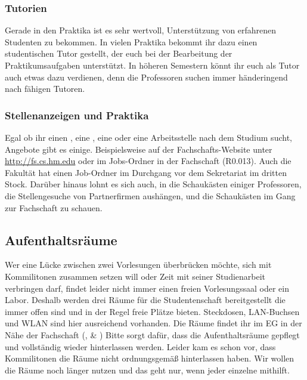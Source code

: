 \subsubsection{Tutorien}
Gerade in den Praktika ist es sehr wertvoll, Unterstützung von 
erfahrenen Studenten zu bekommen. In vielen Praktika bekommt ihr 
dazu einen studentischen Tutor gestellt, der euch bei der Bearbeitung 
der Praktikumsaufgaben unterstützt. \doublebreak
In höheren Semestern könnt ihr euch als Tutor auch etwas dazu 
verdienen, denn die Professoren suchen immer händeringend nach 
fähigen Tutoren. 

\subsubsection{Stellenanzeigen und Praktika}
Egal ob ihr einen , eine , 
eine  oder eine Arbeitsstelle nach dem 
Studium sucht, Angebote gibt es einige. Beispielsweise auf der 
Fachschafts-Website unter \url{http://fs.cs.hm.edu} \arrow {} \arrow {} oder im
Jobs-Ordner in der Fachschaft (R0.013). Auch die Fakultät hat einen Job-Ordner im Durchgang vor dem Sekretariat im dritten Stock. Darüber 
hinaus lohnt es sich auch, in die Schaukästen einiger Professoren, die
Stellengesuche von Partnerfirmen aushängen, und die Schaukästen im Gang zur Fachschaft zu schauen.

\subsection{Aufenthaltsräume}
Wer eine Lücke zwischen zwei Vorlesungen überbrücken möchte, sich mit Kommilitonen
zusammen setzen will oder Zeit mit seiner Studienarbeit verbringen darf, findet leider nicht
immer einen freien Vorlesungssaal oder ein Labor. 
Deshalb werden drei Räume für die Studentenschaft bereitgestellt die 
immer offen sind und in der Regel freie Plätze bieten. Steckdosen, LAN-Buchsen und WLAN sind hier ausreichend vorhanden. Die Räume findet 
ihr im EG in der Nähe der Fachschaft (,  \& )
Bitte sorgt dafür, dass die Aufenthaltsräume gepflegt und vollständig wieder hinterlassen werden.
Leider kam es schon vor, dass Kommilitonen die Räume nicht ordnungsgemäß hinterlassen haben.
Wir wollen die Räume noch länger nutzen und das geht nur, wenn jeder einzelne mithilft.